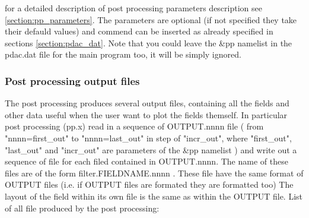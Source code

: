 for a detailed description of post processing parameters 
description see \ref{section:pp_parameters}.
The parameters are optional (if not specified they take their 
defauld values) and commend can be inserted as already specified in
sections \ref{section:pdac_dat}.
Note that you could leave the \&pp namelist in the pdac.dat file
for the main program too, it will be simply ignored.

\subsubsection{Post processing output files}

The post processing produces  several output files, 
containing all the fields and other data useful when
the user want to plot the fields themself.
In particular post processing (pp.x) read in a sequence
of OUTPUT.nnnn file ( from "nnnn=first\_out" to "nnnn=last\_out"
in step of "incr\_out", where "first\_out", "last\_out" and "incr\_out"
are parameters of the \&pp namelist ) and write out
a sequence of file for each filed contained in OUTPUT.nnnn.
The name of these files are of the form filter.FIELDNAME.nnnn .
These file have the same format of OUTPUT files (i.e.
if OUTPUT files are formated they are formatted too)
The layout of the field within its own file is the same
as within the OUTPUT file.
List of all file produced by the post processing:

